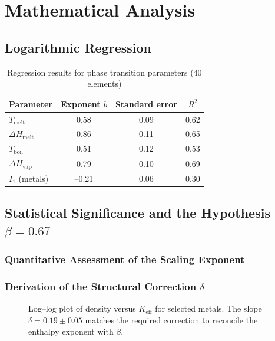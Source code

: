 \documentclass[12pt,a4paper]{article}
\newcommand{\Keff}{K_{\mathrm{eff}}}
\begin{document}
	\section{Mathematical Analysis}
	\subsection{Logarithmic Regression}
	\begin{table}[htbp]
		\centering
		\caption{Regression results for phase transition parameters (40 elements)}
		\label{tab:regression}
		\begin{tabular}{@{}lccc@{}}
			\toprule
			\textbf{Parameter} & \textbf{Exponent }\(b\) & \textbf{Standard error} & \textbf{\(R^2\)} \\
			\midrule
			\(T_{\text{melt}}\)   & 0.58 & 0.09 & 0.62 \\
			\(\Delta H_{\text{melt}}\) & 0.86 & 0.11 & 0.65 \\
			\(T_{\text{boil}}\)   & 0.51 & 0.12 & 0.53 \\
			\(\Delta H_{\text{vap}}\) & 0.79 & 0.10 & 0.69 \\
			\(I_1\) (metals)      & --0.21 & 0.06 & 0.30 \\
			\bottomrule
		\end{tabular}
	\end{table}
	
	\subsection{Statistical Significance and the Hypothesis \(\beta = 0.67\)}
	\subsubsection{Quantitative Assessment of the Scaling Exponent}
	\subsubsection{Derivation of the Structural Correction \(\delta\)}
	
	\begin{figure}[htbp]
		\centering
		\caption{Log–log plot of density versus \(\Keff\) for selected metals. The slope \(\delta = 0.19 \pm 0.05\) matches the required correction to reconcile the enthalpy exponent with \(\beta\).}
		\label{fig:density_scaling}
	\end{figure}
	
\end{document}

